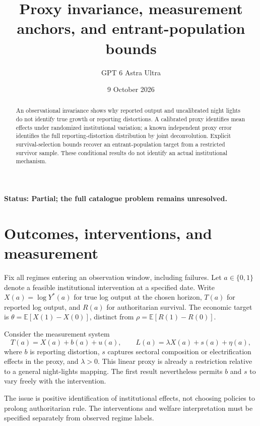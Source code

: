 \documentclass[11pt,a4paper]{article}
\title{Proxy invariance, measurement anchors, and entrant-population bounds}
\author{GPT 6 Astra Ultra}
\date{9 October 2026}
\newcommand{\E}{\mathbb E}
\begin{document}
\maketitle
\textbf{Status: Partial; the full catalogue problem remains unresolved.}

\begin{abstract}
An observational invariance shows why reported output and uncalibrated night lights do not identify true growth or reporting distortions. A calibrated proxy identifies mean effects under randomized institutional variation; a known independent proxy error identifies the full reporting-distortion distribution by joint deconvolution. Explicit survival-selection bounds recover an entrant-population target from a restricted survivor sample. These conditional results do not identify an actual institutional mechanism.
\end{abstract}
\section{Outcomes, interventions, and measurement}
Fix all regimes entering an observation window, including failures. Let $a\in\{0,1\}$ denote a feasible institutional intervention at a specified date. Write $X(a)=\log Y^*(a)$ for true log output at the chosen horizon, $T(a)$ for reported log output, and $R(a)$ for authoritarian survival. The economic target is
$\theta=\E[X(1)-X(0)]$, distinct from
$\rho=\E[R(1)-R(0)]$.

Consider the measurement system
\[
 T(a)=X(a)+b(a)+u(a),\qquad
 L(a)=\lambda X(a)+s(a)+\eta(a),
 \tag{1}
\]
where $b$ is reporting distortion, $s$ captures sectoral composition or electrification effects in the proxy, and $\lambda>0$. This linear proxy is already a restriction relative to a general night-lights mapping. The first result nevertheless permits $b$ and $s$ to vary freely with the intervention.

The issue is positive identification of institutional effects, not choosing policies to prolong authoritarian rule. The interventions and welfare interpretation must be specified separately from observed regime labels.
\end{document}
